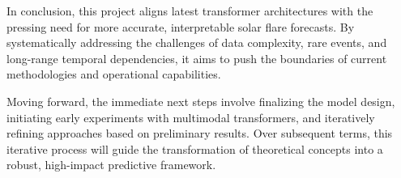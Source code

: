 In conclusion, this project aligns latest transformer architectures with the pressing need for more accurate, interpretable solar flare forecasts. By systematically addressing the challenges of data complexity, rare events, and long-range temporal dependencies, it aims to push the boundaries of current methodologies and operational capabilities.

Moving forward, the immediate next steps involve finalizing the model design, initiating early experiments with multimodal transformers, and iteratively refining approaches based on preliminary results. Over subsequent terms, this iterative process will guide the transformation of theoretical concepts into a robust, high-impact predictive framework.